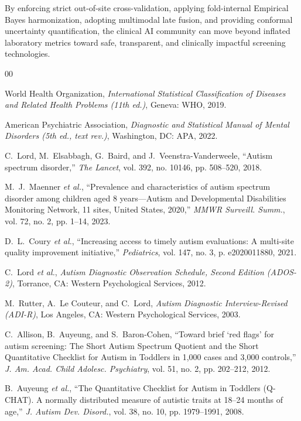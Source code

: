\documentclass[journal]{IEEEtran}
\begin{document}
By enforcing strict out-of-site cross-validation, applying fold-internal Empirical Bayes harmonization, adopting multimodal late fusion, and providing conformal uncertainty quantification, the clinical AI community can move beyond inflated laboratory metrics toward safe, transparent, and clinically impactful screening technologies.

\begin{thebibliography}{00}

World Health Organization, \textit{International Statistical Classification of Diseases and Related Health Problems (11th ed.)}, Geneva: WHO, 2019.

American Psychiatric Association, \textit{Diagnostic and Statistical Manual of Mental Disorders (5th ed., text rev.)}, Washington, DC: APA, 2022.

C.~Lord, M.~Elsabbagh, G.~Baird, and J.~Veenstra-Vanderweele, ``Autism spectrum disorder,'' \textit{The Lancet}, vol. 392, no. 10146, pp. 508--520, 2018.

M.~J.~Maenner \textit{et al.}, ``Prevalence and characteristics of autism spectrum disorder among children aged 8 years---Autism and Developmental Disabilities Monitoring Network, 11 sites, United States, 2020,'' \textit{MMWR Surveill. Summ.}, vol. 72, no. 2, pp. 1--14, 2023.

D.~L.~Coury \textit{et al.}, ``Increasing access to timely autism evaluations: A multi-site quality improvement initiative,'' \textit{Pediatrics}, vol. 147, no. 3, p. e2020011880, 2021.

C.~Lord \textit{et al.}, \textit{Autism Diagnostic Observation Schedule, Second Edition (ADOS-2)}, Torrance, CA: Western Psychological Services, 2012.

M.~Rutter, A.~Le Couteur, and C.~Lord, \textit{Autism Diagnostic Interview-Revised (ADI-R)}, Los Angeles, CA: Western Psychological Services, 2003.

C.~Allison, B.~Auyeung, and S.~Baron-Cohen, ``Toward brief `red flags' for autism screening: The Short Autism Spectrum Quotient and the Short Quantitative Checklist for Autism in Toddlers in 1,000 cases and 3,000 controls,'' \textit{J. Am. Acad. Child Adolesc. Psychiatry}, vol. 51, no. 2, pp. 202--212, 2012.

B.~Auyeung \textit{et al.}, ``The Quantitative Checklist for Autism in Toddlers (Q-CHAT). A normally distributed measure of autistic traits at 18--24 months of age,'' \textit{J. Autism Dev. Disord.}, vol. 38, no. 10, pp. 1979--1991, 2008.


\end{thebibliography}
\end{document}
